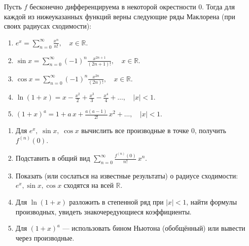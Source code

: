 
\begin{customtheorem}
	Пусть $f$ бесконечно дифференцируема в некоторой окрестности $0$. Тогда для
	каждой из нижеуказанных функций верны следующие ряды Маклорена (при своих радиусах сходимости):

	\begin{enumerate}
		\item $e^x = \displaystyle \sum_{n=0}^{\infty} \frac{x^n}{n!}, \quad x\in\mathbb{R}.$
		\item $\sin x = \displaystyle \sum_{n=0}^{\infty} (-1)^n \frac{x^{2n+1}}{(2n+1)!}, \quad x\in\mathbb{R}.$
		\item $\cos x = \displaystyle \sum_{n=0}^{\infty} (-1)^n \frac{x^{2n}}{(2n)!}, \quad x\in\mathbb{R}.$
		\item $\ln(1+x) = \displaystyle x - \frac{x^2}{2} + \frac{x^3}{3} - \frac{x^4}{4} + \dots,\quad |x|<1.$
		\item $(1+x)^a = \displaystyle 1 + a\,x + \frac{a(a-1)}{2!}\,x^2 + \dots,\quad |x|<1.$
	\end{enumerate}
\end{customtheorem}

\begin{proofplan}
	\begin{enumerate}
		\item Для $e^x,\;\sin x,\;\cos x$ вычислить все производные в точке 0, получить $f^{(n)}(0)$.
		\item Подставить в общий вид \(\sum_{n=0}^\infty \tfrac{f^{(n)}(0)}{n!}\,x^n\).
		\item Показать (или сослаться на известные результаты) о радиусе сходимости:
		      $e^x, \sin x, \cos x$ сходятся на всей $\mathbb{R}$.
		\item Для $\ln(1+x)$ разложить в степенной ряд при $|x|<1$, найти формулы производных,
		      увидеть знакочередующиеся коэффициенты.
		\item Для $(1+x)^a$ --- использовать бином Ньютона (обобщённый) или вывести через производные.
	\end{enumerate}
\end{proofplan}

